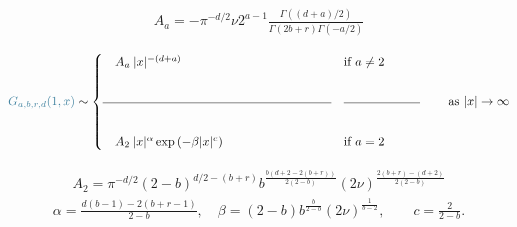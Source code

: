 \documentclass[9pt,table,xcolor=dvipsnames]{beamer}%
\begin{document}
\begin{frame}[fragile,t] %
 \begin{center}

   {\small
   \begin{align*}
     A_a = -\pi^{-d/2}\nu 2^{ a -1}\frac{\Gamma((d+ a )/2)}{\Gamma(2 b +r)\Gamma(- a /2)}
   \end{align*}}

   \vfill
   \mySeparateLine
   \vfill

   \begin{align*}
     \textcolor{contrast_color_3}{G_{ a , b ,r,d}(1,x)} \sim
      \begin{cases}
         \quad A_{ a } \: |x|^{-(d+ a )}                           & \text{if $ a \ne 2$}         \\[1.6em]
         \rule{0.3\paperwidth}{0.4pt}                              & \rule{0.1\paperwidth}{0.4pt} \\[2em]
         \quad A_{2}   \: |x|^{\alpha}\exp\left(-\beta|x|^c\right) & \text{if $ a =2$}
      \end{cases} \qquad  \text{as $|x|\to\infty$}
   \end{align*}

   \bigskip
   \mySeparateLine

   \small
   \begin{align*}
     A_{ 2 }= \pi^{-d/2} (2- b )^{d/2-( b +r)} b ^{\frac{ b (d+2-2( b +r))}{2(2- b )}}(2\nu)^{\frac{2( b +r)-(d+2)}{2(2- b )}}
   \end{align*}
   \begin{align*}
     \alpha = \frac{d( b -1)-2( b +r-1)}{2- b }, \quad
     \beta  = (2- b ) b ^{\frac{ b }{2- b }}(2\nu)^{\frac{1}{ b -2}}, \qquad
     c      = \frac{2}{2- b }.
   \end{align*}
 \end{center}
\end{frame}
\end{document}
